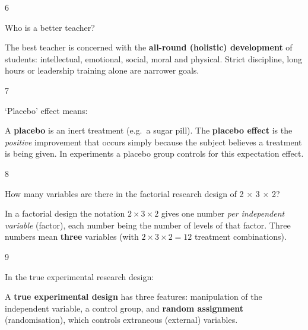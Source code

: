 \begin{question}{6}
{Who is a better teacher?\par}
\begin{explain}
The best teacher is concerned with the \textbf{all-round (holistic) development} of students: intellectual, emotional, social, moral and physical. Strict discipline, long hours or leadership training alone are narrower goals.
\end{explain}
\end{question}

\begin{question}{7}
{`Placebo' effect means:\par}
\begin{explain}
A \textbf{placebo} is an inert treatment (e.g.\ a sugar pill). The \textbf{placebo effect} is the \emph{positive} improvement that occurs simply because the subject believes a treatment is being given. In experiments a placebo group controls for this expectation effect.
\end{explain}
\end{question}

\begin{question}{8}
{How many variables are there in the factorial research design of 2 $\times$ 3 $\times$ 2?\par}
\begin{explain}
In a factorial design the notation $2\times3\times2$ gives one number \emph{per independent variable} (factor), each number being the number of levels of that factor. Three numbers mean \textbf{three} variables (with $2\times3\times2=12$ treatment combinations).
\end{explain}
\end{question}

\begin{question}{9}
{In the true experimental research design:\par}
\begin{explain}
A \textbf{true experimental design} has three features: manipulation of the independent variable, a control group, and \textbf{random assignment} (randomisation), which controls extraneous (external) variables.
\end{explain}
\end{question}

